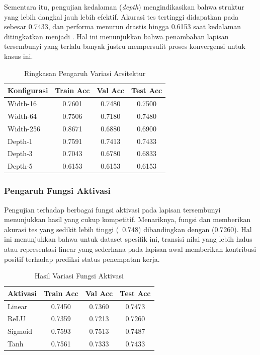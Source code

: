 Sementara itu, pengujian kedalaman (\textit{depth}) mengindikasikan bahwa struktur yang lebih dangkal jauh lebih efektif. Akurasi tes tertinggi didapatkan pada  sebesar 0.7433, dan performa menurun drastis hingga 0.6153 saat kedalaman ditingkatkan menjadi . Hal ini menunjukkan bahwa penambahan lapisan tersembunyi yang terlalu banyak justru mempersulit proses konvergensi untuk kasus ini.

\begin{table}[H]
\centering
\caption{Ringkasan Pengaruh Variasi Arsitektur}
\begin{tabular}{lccc}
\hline
\textbf{Konfigurasi} & \textbf{Train Acc} & \textbf{Val Acc} & \textbf{Test Acc} \\
\hline
Width-16  & 0.7601 & 0.7480 & 0.7500 \\
Width-64  & 0.7506 & 0.7180 & 0.7480 \\
Width-256 & 0.8671 & 0.6880 & 0.6900 \\
\hline
Depth-1   & 0.7591 & 0.7413 & 0.7433 \\
Depth-3   & 0.7043 & 0.6780 & 0.6833 \\
Depth-5   & 0.6153 & 0.6153 & 0.6153 \\
\hline
\end{tabular}
\end{table}

\subsubsection{Pengaruh Fungsi Aktivasi}

Pengujian terhadap berbagai fungsi aktivasi pada lapisan tersembunyi menunjukkan hasil yang cukup kompetitif. Menariknya, fungsi  dan  memberikan akurasi tes yang sedikit lebih tinggi (~0.748) dibandingkan dengan  (0.7260). Hal ini menunjukkan bahwa untuk dataset spesifik ini, transisi nilai yang lebih halus atau representasi linear yang sederhana pada lapisan awal memberikan kontribusi positif terhadap prediksi status penempatan kerja.

\begin{table}[H]
\centering
\caption{Hasil Variasi Fungsi Aktivasi}
\begin{tabular}{lccc}
\hline
\textbf{Aktivasi} & \textbf{Train Acc} & \textbf{Val Acc} & \textbf{Test Acc} \\
\hline
Linear  & 0.7450 & 0.7360 & 0.7473 \\
ReLU    & 0.7359 & 0.7213 & 0.7260 \\
Sigmoid & 0.7593 & 0.7513 & 0.7487 \\
Tanh    & 0.7561 & 0.7333 & 0.7433 \\
\hline
\end{tabular}
\end{table}

